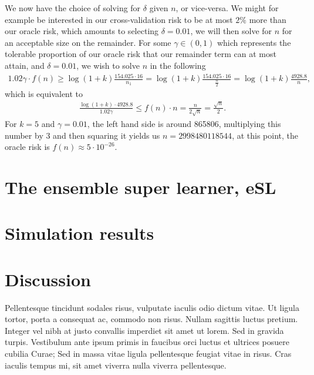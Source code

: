 \documentclass[11pt, a4paper]{article}
\newtheorem{theorem}{Theorem}
\theoremstyle{definition}
\theoremstyle{remark}
\newcommand{\cl}{q}
\begin{document}
We now have the choice of solving for $ \delta $ given $ n $, or vice-versa. We might for example be interested in our cross-validation risk to be at most $ 2\% $ more than our oracle risk, which amounts to selecting $ \delta = 0.01 $, we will then solve for $ n $ for an acceptable size on the remainder. For some $ \gamma \in (0, 1) $ which represents the tolerable proportion of our oracle risk that our remainder term can at most attain, and $ \delta = 0.01$, we wish to solve  $ n $ in the following 
\begin{align*}
    1.02  \gamma \cdot f(n) \geq \log (1 + k) \frac{154.025 \cdot 16 }{n_1} =  \log (1 + k) \frac{154.025 \cdot 16 }{\frac{n}{2}} = \log (1 + k) \frac{4928.8}{n},
\end{align*}
which is equivalent to 
\begin{align*}
    \frac{\log (1 + k) \cdot 4928.8}{1.02 \gamma } \leq f(n) \cdot n = \frac{n}{2 \sqrt{n}} = \frac{\sqrt{n}}{ 2} .
\end{align*}
For $ k = 5 $ and $ \gamma = 0.01 $, the left hand side is around 865806, multiplying this number by 3 and then squaring it yields us $n = 2998480118544 $, at this point, the oracle risk is $ f(n) \approx 5 \cdot 10^{-26}$. 



\section{The ensemble super learner, eSL}
\section{Simulation results}
\section{Discussion}
Pellentesque tincidunt sodales risus, vulputate iaculis odio dictum vitae. Ut ligula tortor, porta a consequat ac, commodo non risus. Nullam sagittis luctus pretium. Integer vel nibh at justo convallis imperdiet sit amet ut lorem. Sed in gravida turpis. Vestibulum ante ipsum primis in faucibus orci luctus et ultrices posuere cubilia Curae; Sed in massa vitae ligula pellentesque feugiat vitae in risus. Cras iaculis tempus mi, sit amet viverra nulla viverra pellentesque.
\end{document}
